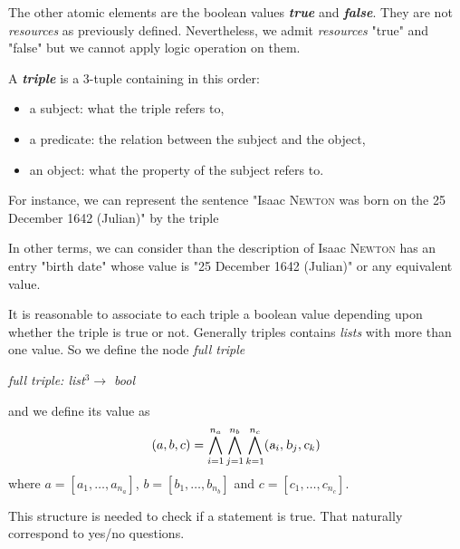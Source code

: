 The other atomic elements are the boolean values \textsl{\bf true} and \textsl{\bf false}. They are not \textsl{resources} as previously defined. Nevertheless, we admit \textsl{resources} "true" and "false" but we cannot apply logic operation on them.

A \textsl{\bf triple} is a 3-tuple containing in this order:
\begin{itemize}
    \item a subject: what the triple refers to,
    \item a predicate: the relation between the subject and the object,
    \item an object: what the property of the subject refers to.
\end{itemize}

For instance, we can represent the sentence "Isaac \textsc{Newton} was born on the 25 December 1642 (Julian)" by the triple
\begin{figure}[!ht]
    \centering
\end{figure}
\FloatBarrier
In other terms, we can consider than the description of Isaac \textsc{Newton} has an entry "birth date" whose value is "25 December 1642 (Julian)" or any equivalent value.

It is reasonable to associate to each triple a boolean value depending upon whether the triple is true or not. Generally triples contains \textsl{lists} with more than one value. So we define the node \textsl{full triple} 
\begin{center}
\textsl{full triple: list$^3\rightarrow$ bool}
\end{center}
and we define its value as $$(a,b,c)=\bigwedge_{i=1}^{n_a}\bigwedge_{j=1}^{n_b}\bigwedge_{k=1}^{n_c} (\textsl{a}_i,\textsl{b}_j,\textsl{c}_k)$$where $a=[a_1,\ldots,a_{n_a}]$, $b=[b_1,\ldots,b_{n_b}]$ and $c=[c_1,\ldots,c_{n_c}]$.

This structure is needed to check if a statement is true. That naturally correspond to yes/no questions.

